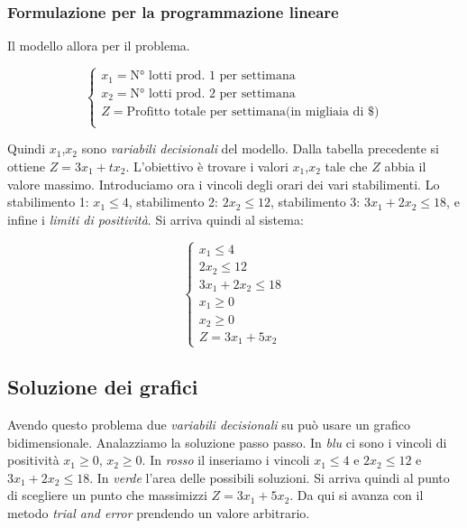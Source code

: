 \documentclass{article}
\begin{document}
      \subsubsection{Formulazione per la programmazione lineare}
        Il modello allora per il problema.

        $$
          \begin{cases}
            x_1 = \text{N° lotti prod. 1 per settimana} \\
            x_2 = \text{N° lotti prod. 2 per settimana} \\ 
            Z = \text{Profitto totale per settimana(in migliaia di \$)} \\
          \end{cases}
        $$

        Quindi $x_1$,$x_2$ sono \textit{variabili decisionali} del modello. Dalla tabella precedente si ottiene $Z = 3x_1+tx_2$. L'obiettivo è trovare i valori $x_1$,$x_2$ tale che $Z$ abbia il valore massimo. Introduciamo ora i vincoli degli orari dei vari stabilimenti. Lo stabilimento 1: $x_1\le4$, stabilimento 2: $2x_2\le12$, stabilimento 3: $3x_1+2x_2\le18$, e infine i \textit{limiti di positività}. Si arriva quindi al sistema:

        $$
          \begin{cases}
            x_1 \le 4 \\
            2x_2 \le 12 \\
            3x_1 + 2x_2 \le 18 \\
            x_1 \ge 0 \\
            x_2 \ge 0 \\
            Z = 3x_1 + 5x_2
            
          \end{cases}
        $$

      \subsection{Soluzione dei grafici}
        Avendo questo problema due \textit{variabili decisionali} su può usare un grafico bidimensionale. Analazziamo la soluzione passo passo. In \textit{blu} ci sono i vincoli di positività $x_1\ge0$, $x_2\ge0$. In \textit{rosso} il inseriamo i vincoli $x_1\le4$ e $2x_2\le12$ e $3x_1+2x_2\le18$. In \textit{verde} l'area delle possibili soluzioni. Si arriva quindi al punto di scegliere un punto che massimizzi $Z=3x_1+5x_2$. Da qui si avanza con il metodo \textit{trial and error} prendendo un valore arbitrario.
\end{document}
